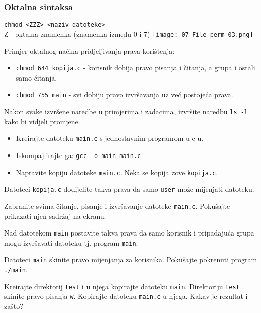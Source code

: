 \subsubsection*{Oktalna sintaksa}
\texttt{chmod <ZZZ> <naziv\_datoteke>}\\
Z - oktalna znamenka (znamenka između 0 i 7)
\texttt{[image: 07\_File\_perm\_03.png]}

\begin{primjer}Primjer oktalnog načina pridjeljivanja prava korištenja:
\begin{itemize}
 \item \texttt{chmod 644 kopija.c} - korisnik dobija pravo pisanja i čitanja, a grupa i ostali samo čitanja.
\item \texttt{chmod 755 main} - svi dobiju pravo izvršavanja uz već postojeća prava.
\end{itemize}
\end{primjer}

\begin{zadatak} Nakon svake izvršene naredbe u primjerima i zadacima, izvršite naredbu \texttt{ls -l} kako bi vidjeli promjene.
\begin{itemize}
\item Kreirajte datoteku \texttt{main.c} s jednostavnim programom u c-u.
\item Iskompajlirajte ga: \texttt{gcc -o main main.c} 
\item Napravite kopiju datoteke \texttt{main.c}. Neka se kopija zove \texttt{kopija.c}.
\end{itemize}
\end{zadatak}

\begin{zadatak}
Datoteci \texttt{kopija.c} dodijelite takva prava da samo \texttt{user} može mijenjati datoteku. 
\end{zadatak}

\begin{zadatak}
	Zabranite svima čitanje, pisanje i izvršavanje datoteke \texttt{main.c}. Pokušajte prikazati njen sadržaj na ekranu.
\end{zadatak}

\begin{zadatak}
Nad datotekom \texttt{main} postavite takva prava da samo korisnik i pripadajuća grupa mogu izvršavati datoteku tj. program \texttt{main}.
\end{zadatak}

\begin{zadatak}
Datoteci \texttt{main} skinite pravo mijenjanja za korisnika. Pokušajte pokrenuti program \texttt{./main}.
\end{zadatak}

\begin{zadatak}
Kreirajte direktorij \texttt{test} i u njega kopirajte datoteku \texttt{main}. Direktoriju \texttt{test} skinite pravo pisanja \texttt{w}. Kopirajte datoteku \texttt{main.c} u njega. Kakav je rezultat i zašto? 
\end{zadatak}

